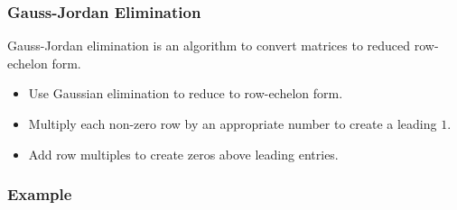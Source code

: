 \documentclass[12pt]{report}
\begin{document}
\begin{flushleft}
\subsubsection*{Gauss-Jordan Elimination}

Gauss-Jordan elimination is an algorithm to convert matrices to reduced
row-echelon form. 
\begin{itemize}
  \item Use Gaussian elimination to reduce to row-echelon form.
  \item Multiply each non-zero row by an appropriate number to create a
      leading \(1\).
  \item Add row multiples to create zeros above leading entries.
\end{itemize}

\subsubsection*{Example}


\end{flushleft}
\end{document}
